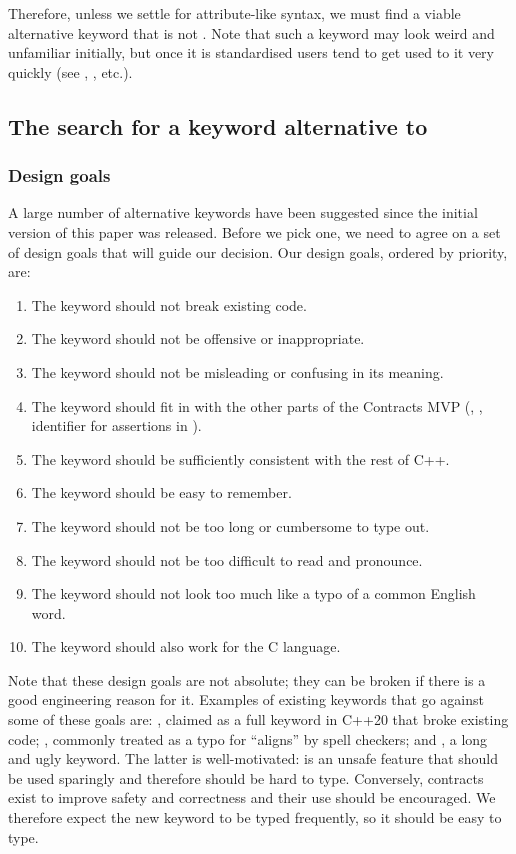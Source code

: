 Therefore, unless we settle for attribute-like syntax, we must find a viable alternative keyword that is not . Note that such a keyword may look weird and unfamiliar initially, but once it is standardised users tend to get used to it very quickly (see , , etc.).

\subsection{The search for a keyword alternative to }
\label{subsec:keyword}

\subsubsection{Design goals}
\label{subsubsec:keyword_goals}
A large number of alternative keywords have been suggested since the initial version of this paper was released. Before we pick one, we need to agree on a set of design goals that will guide our decision. Our design goals, ordered by priority, are:
\begin{enumerate}
\item The keyword should not break existing code.
\item The keyword should not be offensive or inappropriate.
\item The keyword should not be misleading or confusing in its meaning.
\item The keyword should fit in with the other parts of the Contracts MVP (, , identifier for assertions in \mbox{}).
\item The keyword should be sufficiently consistent with the rest of C++.
\item The keyword should be easy to remember.
\item The keyword should not be too long or cumbersome to type out.
\item The keyword should not be too difficult to read and pronounce.
\item The keyword should not look too much like a typo of a common English word.
\item The keyword should also work for the C language.
\end{enumerate}
Note that these design goals are not absolute; they can be broken if there is a good engineering reason for it. Examples of existing keywords that go against some of these goals are: , claimed as a full keyword in C++20 that broke existing code; , commonly treated as a typo for ``aligns'' by spell checkers; and , a long and ugly keyword. The latter is well-motivated: is an unsafe feature that should be used sparingly and therefore should be hard to type. Conversely, contracts exist to improve safety and correctness and their use should be encouraged. We therefore expect the new keyword to be typed frequently, so it should be easy to type.


